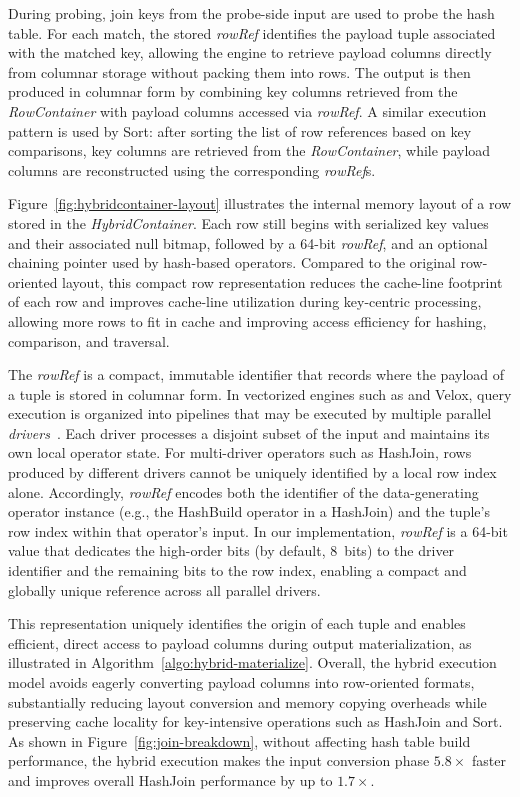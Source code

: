 During probing, join keys from the probe-side input are used to probe the hash table.
For each match, the stored \emph{rowRef} identifies the payload tuple associated with the matched key, allowing the engine to retrieve payload columns directly from columnar storage without packing them into rows.
The output is then produced in columnar form by combining key columns retrieved from the \emph{RowContainer} with payload columns accessed via \emph{rowRef}.
A similar execution pattern is used by Sort: after sorting the list of row references based on key comparisons, key columns are retrieved from the \emph{RowContainer}, while payload columns are reconstructed using the corresponding \emph{rowRef}s.

Figure~\ref{fig:hybridcontainer-layout} illustrates the internal memory layout of a row stored in the \proj \emph{HybridContainer}.
Each row still begins with serialized key values and their associated null bitmap, followed by a 64-bit \emph{rowRef}, and an optional chaining pointer used by hash-based operators. Compared to the original row-oriented layout, this compact row representation reduces the cache-line footprint of each row and improves cache-line utilization during key-centric processing, allowing more rows to fit in cache and improving access efficiency for hashing, comparison, and traversal.

The \emph{rowRef} is a compact, immutable identifier that records where the payload of a tuple is stored in columnar form. 
In vectorized engines such as \proj and Velox, query execution is organized into pipelines that may be executed by multiple parallel \emph{drivers}~\cite{velox-pipelines}.
Each driver processes a disjoint subset of the input and maintains its own local operator state.
For multi-driver operators such as HashJoin, rows produced by different drivers cannot be uniquely identified by a local row index alone.
Accordingly, \emph{rowRef} encodes both the identifier of the data-generating operator instance (e.g., the HashBuild operator in a HashJoin) and the tuple’s row index within that operator’s input.
In our implementation, \emph{rowRef} is a 64-bit value that dedicates the high-order bits (by default, 8~bits) to the driver identifier and the remaining bits to the row index, enabling a compact and globally unique reference across all parallel drivers.

This representation uniquely identifies the origin of each tuple and enables efficient, direct access to payload columns during output materialization, as illustrated in Algorithm~\ref{algo:hybrid-materialize}.
Overall, the hybrid execution model avoids eagerly converting payload columns into row-oriented formats, substantially reducing layout conversion and memory copying overheads while preserving cache locality for key-intensive operations such as HashJoin and Sort.
As shown in Figure~\ref{fig:join-breakdown}, without affecting hash table build performance, the hybrid execution makes the input conversion phase $5.8\times$ faster and improves overall HashJoin performance by up to $1.7\times$.



